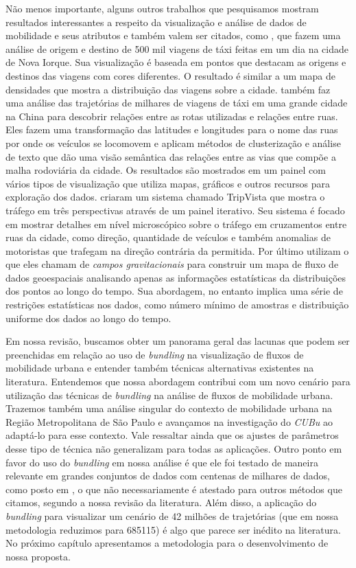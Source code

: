 Não menos importante, alguns outros trabalhos que pesquisamos mostram resultados
interessantes a respeito da visualização e análise de dados de mobilidade e seus
atributos e também valem ser citados, como \citet{Ferreira2013}, que fazem uma
análise de origem e destino de 500 mil viagens de táxi feitas em um dia na
cidade de Nova Iorque. Sua visualização é baseada em pontos que destacam as
origens e destinos das viagens com cores diferentes. O resultado é similar a um
mapa de densidades que mostra a distribuição das viagens sobre a cidade.
\citet{Chu2014} também faz uma análise das trajetórias de milhares de viagens
de táxi em uma grande cidade na China para descobrir relações entre as rotas
utilizadas e relações entre ruas. Eles fazem uma transformação das latitudes e
longitudes para o nome das ruas por onde os veículos se locomovem e aplicam métodos de
clusterização e análise de texto que dão uma visão semântica das relações entre
as vias que compõe a malha rodoviária da cidade. Os resultados são mostrados em
um painel com vários tipos de visualização que utiliza mapas, gráficos e outros
recursos para exploração dos dados. \citet{Guo2011} criaram um sistema chamado
TripVista que mostra o tráfego em três perspectivas através de um painel
iterativo.  Seu sistema é focado em mostrar detalhes em nível microscópico
sobre o tráfego em cruzamentos entre ruas da cidade, como direção, quantidade
de veículos e também anomalias de motoristas que trafegam na direção contrária
da permitida. Por último \citet{Kim2018} utilizam o que eles chamam de \emph{campos
gravitacionais} para construir um mapa de fluxo de dados geoespaciais
analisando apenas as informações estatísticas da distribuições dos pontos ao
longo do tempo. Sua abordagem, no entanto implica uma série de restrições
estatísticas nos dados, como número mínimo de amostras e distribuição uniforme
dos dados ao longo do tempo.

Em nossa revisão, buscamos obter um panorama geral das lacunas que podem ser
preenchidas em relação ao uso de \emph{bundling} na visualização de fluxos de
mobilidade urbana e entender também técnicas alternativas existentes na
literatura. Entendemos que nossa abordagem contribui com um novo cenário para
utilização das técnicas de \emph{bundling} na análise de fluxos de mobilidade
urbana. Trazemos também uma análise singular do contexto de
mobilidade urbana na Região Metropolitana de São Paulo e avançamos na
investigação do \emph{CUBu} ao adaptá-lo para esse contexto. Vale ressaltar
ainda que os ajustes de parâmetros desse tipo de técnica não generalizam para
todas as aplicações. Outro ponto em favor do uso do \emph{bundling} em nossa
análise é que ele foi testado de maneira relevante em grandes conjuntos de dados
com centenas de milhares de dados, como posto em \citet{Telea2018,
Lhuillier2017}, o que não necessariamente é atestado para outros métodos que
citamos, segundo a nossa revisão da literatura. Além disso, a aplicação do
\emph{bundling} para visualizar um cenário de 42 milhões de trajetórias (que em
nossa metodologia reduzimos para \num{685115}) é algo que parece ser inédito
na literatura. No próximo capítulo apresentamos a metodologia para o
desenvolvimento de nossa proposta.